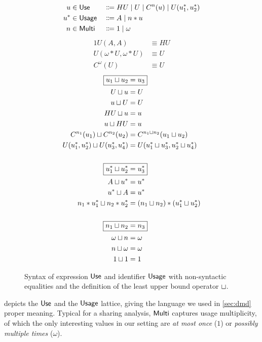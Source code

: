 \begin{figure}
\begin{alignat*}{2}
u   &\in \text{\textsf{Use}}   &{} \Coloneqq {}& HU \mid U \mid C^n(u) \mid U(u^*_1, u^*_2) \\
u^* &\in \text{\textsf{Usage}} &{} \Coloneqq {}& A \mid n*u \\
n   &\in \text{\textsf{Multi}} &{} \Coloneqq {}& 1 \mid \omega
\end{alignat*}
\begin{alignat*}{1}
U(A,A)               &\equiv HU \\
U(\omega*U,\omega*U) &\equiv U \\
C^\omega(U)          &\equiv U
\end{alignat*}
\begin{alignat*}{1}
  \Aboxed{u_1 \llub u_2 &= u_3} \\
  U \llub u  &= U \\
  u \llub U  &= U \\
  HU \llub u &= u \\
  u \llub HU &= u \\
  C^{n_1}(u_1) \llub C^{n_2}(u_2) &= C^{n_1 \llub n_2}(u_1 \llub u_2) \\
  U(u^*_1, u^*_2) \llub U(u^*_3, u^*_4) &= U(u^*_1 \llub u^*_3, u^*_2 \llub u^*_4) \\
  &\\
  \Aboxed{u^*_1 \llub u^*_2 &= u^*_3} \\
  A \llub u^* &= u^* \\
  u^* \llub A &= u^* \\ 
  n_1*u^*_1 \llub n_2*u^*_2 &= (n_1 \llub n_2) * (u^*_1 \llub u^*_2) \\
  &\\
  \Aboxed{n_1 \llub n_2 &= n_3} \\
  \omega \llub n &= \omega \\
  n \llub \omega &= \omega \\
  1 \llub 1 &= 1 \\
\end{alignat*}
\caption{Syntax of expression $\text{\textsf{Use}}$ and identifier $\text{\textsf{Usage}}$ with non-syntactic equalities and the definition of the least upper bound operator $\sqcup$.}
\label{fig:usg}
\end{figure}

 depicts the $\text{\textsf{Use}}$ and the $\text{\textsf{Usage}}$ lattice, giving the language we used in \cref{sec:dmd} proper meaning. 
Typical for a sharing analysis, $\text{\textsf{Multi}}$ captures usage multiplicity, of which the only interesting values in our setting are \emph{at most once} ($1$) or \emph{possibly multiple times} ($\omega$).

